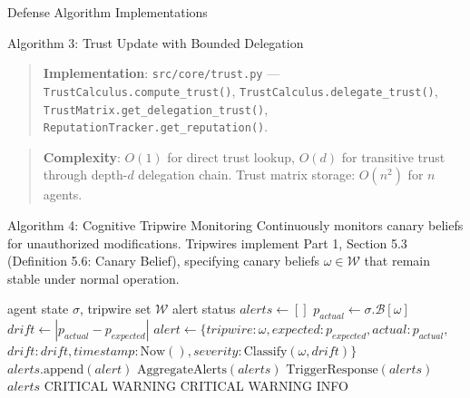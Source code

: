 \documentclass[
  ignorenonframetext,
]{beamer}
\begin{document}
\begin{frame}[fragile]{Defense Algorithm Implementations}
\begin{block}{Algorithm 3: Trust Update with Bounded Delegation}
\begin{quote}
\textbf{Implementation}: \texttt{src/core/trust.py} ---
\texttt{TrustCalculus.compute\_trust()},
\texttt{TrustCalculus.delegate\_trust()},
\texttt{TrustMatrix.get\_delegation\_trust()},
\texttt{ReputationTracker.get\_reputation()}.
\end{quote}

\begin{quote}
\textbf{Complexity}: \(O(1)\) for direct trust lookup, \(O(d)\) for
transitive trust through depth-\(d\) delegation chain. Trust matrix
storage: \(O(n^2)\) for \(n\) agents.
\end{quote}
\end{block}

\begin{block}{Algorithm 4: Cognitive Tripwire Monitoring}
\protect{}\label{sec:alg-tripwire}
Continuously monitors canary beliefs for unauthorized modifications.
Tripwires implement Part 1, Section 5.3 (Definition 5.6: Canary Belief),
specifying canary beliefs \(\omega \in \mathcal{W}\) that remain stable
under normal operation.

\begin{algorithm}
\caption{Tripwire Monitoring}
\label{alg:tripwire-impl}
\begin{algorithmic}[1]
\Require agent state $\sigma$, tripwire set $\mathcal{W}$
\Ensure alert status
  \State $alerts \gets []$
    \State $p_{actual} \gets \sigma.\mathcal{B}[\omega]$
    \State $drift \gets |p_{actual} - p_{expected}|$
      \State $alert \gets \{tripwire: \omega, expected: p_{expected}, actual: p_{actual},$
      \State \quad\quad\quad\quad $drift: drift, timestamp: \text{Now}(), severity: \text{Classify}(\omega, drift)\}$
      \State $alerts.\text{append}(alert)$
    \EndIf
  \EndFor
    \State $\text{AggregateAlerts}(alerts)$
    \State $\text{TriggerResponse}(alerts)$
  \EndIf
  \Return $alerts$
\EndFunction
{}
      \Return CRITICAL
      \Return WARNING
    \EndIf
  \Else
      \Return CRITICAL
      \Return WARNING
    \EndIf
  \EndIf
  \Return INFO
\EndFunction
\end{algorithmic}
\end{algorithm}


\end{block}
\end{frame}
\end{document}
